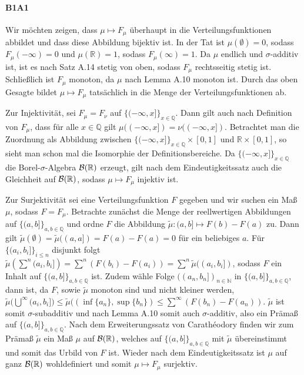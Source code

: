 \documentclass{article}
\begin{document}
\paragraph{B1A1}
Wir möchten zeigen, dass $\mu\mapsto F_\mu$ überhaupt in die Verteilungsfunktionen abbildet und dass diese Abbildung bijektiv ist.
In der Tat ist $\mu(\emptyset)=0$, sodass $F_\mu(-\infty)=0$ und $\mu(\mathbb{R})=1$, sodass $F_\mu(\infty)=1$.
Da $\mu$ endlich und $\sigma$-additiv ist, ist es nach Satz A.14 stetig von oben, sodass $F_\mu$ rechtsseitig stetig ist.
Schließlich ist $F_\mu$ monoton, da $\mu$ nach Lemma A.10 monoton ist.
Durch das oben Gesagte bildet $\mu\mapsto F_\mu$ tatsächlich in die Menge der Verteilungsfunktionen ab.

Zur Injektivität, sei $F_\mu=F_\nu$ auf $\{(-\infty,x]\}_{x\in{\mathbb{Q}}}$.
Dann gilt auch nach Definition von $F_\mu$, dass für alle $x\in \mathbb{Q}$ gilt $\mu((-\infty,x])=\nu((-\infty,x])$.
Betrachtet man die Zuordnung als Abbildung zwischen $\{(-\infty,x]\}_{x\in{\mathbb{Q}}}\times[0,1]$ und $\mathbb{R}\times[0,1]$, so sieht man schon mal die Isomorphie der Definitionsbereiche.
Da $\{(-\infty,x]\}_{x\in{\mathbb{Q}}}$ die Borel-$\sigma$-Algebra ${\cal B}(\mathbb{R})$ erzeugt, gilt nach dem Eindeutigkeitssatz auch die Gleichheit auf ${\cal B}(\mathbb{\mathbb{R}})$, sodass $\mu\mapsto F_\mu$ injektiv ist.

Zur Surjektivität sei eine Verteilungsfunktion $F$ gegeben und wir suchen ein Maß $\mu$, sodass $F=F_\mu$.
Betrachte zunächst die Menge der reellwertigen Abbildungen auf $\{(a,b]\}_{a,b\in\mathbb{Q}}$ und ordne $F$ die Abbildung $\tilde{\mu}\colon(a,b]\mapsto F(b)-F(a)$ zu.
Dann gilt $\tilde{\mu}(\emptyset)=\tilde{\mu}((a,a])=F(a)-F(a)=0$ für ein beliebiges $a$.
Für $\{(a_i,b_i]\}_{i\leq n}$ disjunkt folgt $\tilde{\mu}(\sum^n{(a_i,b_i]})=\sum^n(F(b_i)-F(a_i))=\sum^n\tilde{\mu}((a_i,b_i])$, sodass $F$ ein Inhalt auf $\{(a,b]\}_{a,b\in\mathbb{Q}}$ ist.
Zudem wähle Folge $((a_n,b_n])_{n\in\mathbb{N}}$ in $\{(a,b]\}_{a,b\in\mathbb{Q}}$, dann ist, da $F$, sowie $\tilde{\mu}$ monoton sind und nicht kleiner werden, $\tilde{\mu}\bigl(\bigcup^\infty(a_i,b_i]\bigr)\leq\tilde{\mu}((\inf\{a_n\},\sup\{b_n\})\leq\sum^\infty(F(b_n)-F(a_n))$.
$\tilde{\mu}$ ist somit $\sigma$-subadditiv und nach Lemma A.10 somit auch $\sigma$-additiv, also ein Prämaß auf $\{(a,b]\}_{a,b\in\mathbb{Q}}$.
Nach dem Erweiterungssatz von Carathéodory finden wir zum Prämaß $\tilde{\mu}$ ein Maß $\mu$ auf ${\cal B}(\mathbb{R})$, welches auf $\{(a,b]\}_{a,b\in\mathbb{Q}}$ mit $\tilde{\mu}$ übereinstimmt und somit das Urbild von $F$ ist.
Wieder nach dem Eindeutigkeitssatz ist $\mu$ auf ganz ${\cal B}(\mathbb{R})$ wohldefiniert und somit $\mu\mapsto F_\mu$ surjektiv.
\end{document}
